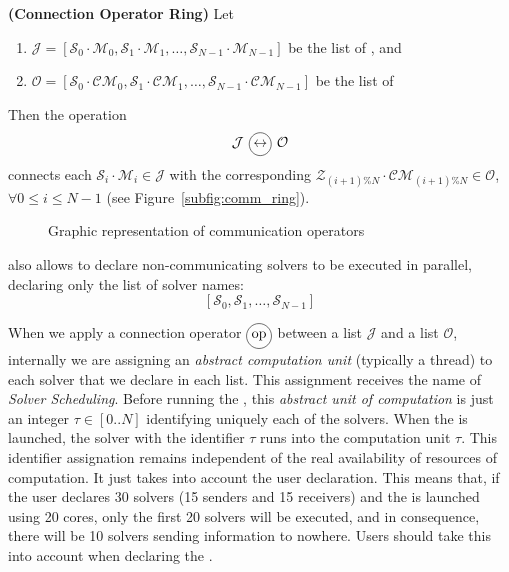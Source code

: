 \begin{definition}\label{op_conn:ring}
{\bf (Connection Operator Ring)} Let 
\begin{enumerate} 
\item $\mathcal{J} = \left[\mathcal{S}_0\cdot \mathcal{M}_0, \mathcal{S}_1\cdot \mathcal{M}_1,\dots, \mathcal{S}_{N-1}\cdot \mathcal{M}_{N-1}\right]$ be the list of \jacks, and 
\item $\mathcal{O} = \left[\mathcal{S}_0\cdot \mathcal{CM}_0, \mathcal{S}_1\cdot \mathcal{CM}_1,\dots, \mathcal{S}_{N-1}\cdot \mathcal{CM}_{N-1}\right]$ be the list of \outlets{} 
\end{enumerate} Then the operation 
\[
\mathcal{J} \poslop{\leftrightarrow} \mathcal{O}
\]
connects each \jack{} $\mathcal{S}_i\cdot \mathcal{M}_i \in \mathcal{J}$ with the corresponding \outlet{} $\mathcal{Z}_{(i+1)\%N}\cdot \mathcal{CM}_{(i+1)\%N} \in \mathcal{O}$, $\forall 0 \leq i \leq N-1$  (see Figure~\ref{subfig:comm_ring}).
\end{definition}

\begin{figure}[h]
\centering
{}
\hspace{0.05\textwidth}%
\hspace{0.05\textwidth}%
\caption[]{Graphic representation of communication operators}
\label{fig:comm}
\end{figure}

\posl{} also allows to declare non-communicating solvers to be executed in parallel, declaring only the list of solver names:
\[
\left[\mathcal{S}_0, \mathcal{S}_1, \dots, \mathcal{S}_{N-1}\right]
\]


When we apply a connection operator $\circled{op}$ between a \jacks{} list $\mathcal{J}$ and a \outlets{} list $\mathcal{O}$, internally we are assigning an \textit{abstract computation unit} (typically a thread) to each solver that we declare in each list. This assignment receives the name of \textit{Solver Scheduling}. Before running the \soset{}, this \textit{abstract unit of computation} is just an integer $\tau \in [0..N]$ identifying uniquely each of the solvers. When the \soset{} is launched, the solver with the identifier $\tau$ runs into the computation unit $\tau$. This identifier assignation remains independent of the real availability of resources of computation. It just takes into account the user declaration. This means that, if the user declares 30 solvers (15 senders and 15 receivers) and the \soset{} is launched using 20 cores, only the first 20 solvers will be executed, and in consequence, there will be 10 solvers sending information to nowhere. Users should take this into account when declaring the \soset.

